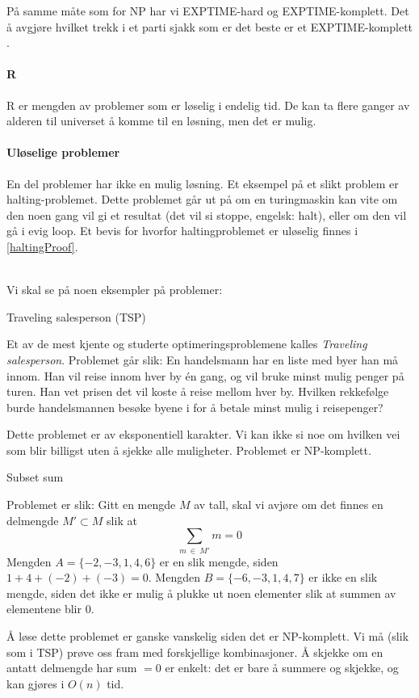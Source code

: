 På samme måte som for NP har vi EXPTIME-hard og EXPTIME-komplett. Det å avgjøre hvilket trekk i et parti sjakk som er det beste er et EXPTIME-komplett . 

\paragraph{R}
R er mengden av problemer som er løselig i endelig tid. De kan ta flere ganger av alderen til universet å komme til en løsning, men det er mulig. 

\paragraph{Uløselige problemer} 
En del problemer har ikke en mulig løsning. Et eksempel på et slikt problem er halting-problemet. Dette problemet går ut på om en turingmaskin kan vite om den noen gang vil gi et resultat (det vil si stoppe, engelsk: halt), eller om den vil gå i evig loop. Et bevis for hvorfor haltingproblemet er uløselig finnes i \ref{haltingProof}. 

~\\
\noindent Vi skal se på noen eksempler på problemer:

\begin{example}
Traveling salesperson (TSP)

Et av de mest kjente og studerte optimeringsproblemene kalles \emph{Traveling salesperson}. Problemet går slik: En handelsmann har en liste med byer han må innom. Han vil reise innom hver by én gang, og vil bruke minst mulig penger på turen. Han vet prisen det vil koste å reise mellom hver by. Hvilken rekkefølge burde handelsmannen besøke byene i for å betale minst mulig i reisepenger?

Dette problemet er av eksponentiell karakter. Vi kan ikke si noe om hvilken vei som blir billigst uten å sjekke alle muligheter. Problemet er NP-komplett.
\end{example}


\begin{example}
Subset sum

Problemet er slik: Gitt en mengde $ M $ av tall, skal vi avjøre om det finnes en delmengde $ M' \subset M $ slik at  \[ \sum_{m~\in~M'} m = 0  \] Mengden $ A =  \{-2, -3, 1, 4, 6\} $ er en slik mengde, siden $ 1 + 4 + (-2) + (-3) = 0 $. Mengden $ B = \{-6, -3, 1, 4, 7\} $ er ikke en slik mengde, siden det ikke er mulig å plukke ut noen elementer slik at summen av elementene blir 0.

Å løse dette problemet er ganske vanskelig siden det er NP-komplett. Vi må (slik som i TSP) prøve oss fram med forskjellige kombinasjoner. Å skjekke om en antatt delmengde har sum $ = 0 $ er enkelt: det er bare å summere og skjekke, og kan gjøres i $ O(n) $ tid. 
\end{example}



